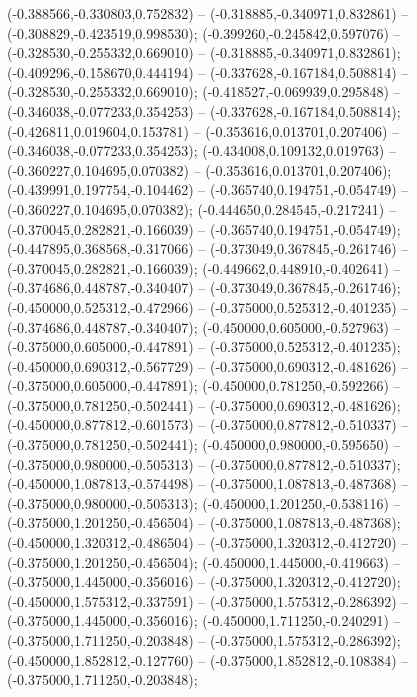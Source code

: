  (-0.388566,-0.330803,0.752832) -- (-0.318885,-0.340971,0.832861) -- (-0.308829,-0.423519,0.998530);
 (-0.399260,-0.245842,0.597076) -- (-0.328530,-0.255332,0.669010) -- (-0.318885,-0.340971,0.832861);
 (-0.409296,-0.158670,0.444194) -- (-0.337628,-0.167184,0.508814) -- (-0.328530,-0.255332,0.669010);
 (-0.418527,-0.069939,0.295848) -- (-0.346038,-0.077233,0.354253) -- (-0.337628,-0.167184,0.508814);
 (-0.426811,0.019604,0.153781) -- (-0.353616,0.013701,0.207406) -- (-0.346038,-0.077233,0.354253);
 (-0.434008,0.109132,0.019763) -- (-0.360227,0.104695,0.070382) -- (-0.353616,0.013701,0.207406);
 (-0.439991,0.197754,-0.104462) -- (-0.365740,0.194751,-0.054749) -- (-0.360227,0.104695,0.070382);
 (-0.444650,0.284545,-0.217241) -- (-0.370045,0.282821,-0.166039) -- (-0.365740,0.194751,-0.054749);
 (-0.447895,0.368568,-0.317066) -- (-0.373049,0.367845,-0.261746) -- (-0.370045,0.282821,-0.166039);
 (-0.449662,0.448910,-0.402641) -- (-0.374686,0.448787,-0.340407) -- (-0.373049,0.367845,-0.261746);
 (-0.450000,0.525312,-0.472966) -- (-0.375000,0.525312,-0.401235) -- (-0.374686,0.448787,-0.340407);
 (-0.450000,0.605000,-0.527963) -- (-0.375000,0.605000,-0.447891) -- (-0.375000,0.525312,-0.401235);
 (-0.450000,0.690312,-0.567729) -- (-0.375000,0.690312,-0.481626) -- (-0.375000,0.605000,-0.447891);
 (-0.450000,0.781250,-0.592266) -- (-0.375000,0.781250,-0.502441) -- (-0.375000,0.690312,-0.481626);
 (-0.450000,0.877812,-0.601573) -- (-0.375000,0.877812,-0.510337) -- (-0.375000,0.781250,-0.502441);
 (-0.450000,0.980000,-0.595650) -- (-0.375000,0.980000,-0.505313) -- (-0.375000,0.877812,-0.510337);
 (-0.450000,1.087813,-0.574498) -- (-0.375000,1.087813,-0.487368) -- (-0.375000,0.980000,-0.505313);
 (-0.450000,1.201250,-0.538116) -- (-0.375000,1.201250,-0.456504) -- (-0.375000,1.087813,-0.487368);
 (-0.450000,1.320312,-0.486504) -- (-0.375000,1.320312,-0.412720) -- (-0.375000,1.201250,-0.456504);
 (-0.450000,1.445000,-0.419663) -- (-0.375000,1.445000,-0.356016) -- (-0.375000,1.320312,-0.412720);
 (-0.450000,1.575312,-0.337591) -- (-0.375000,1.575312,-0.286392) -- (-0.375000,1.445000,-0.356016);
 (-0.450000,1.711250,-0.240291) -- (-0.375000,1.711250,-0.203848) -- (-0.375000,1.575312,-0.286392);
 (-0.450000,1.852812,-0.127760) -- (-0.375000,1.852812,-0.108384) -- (-0.375000,1.711250,-0.203848);
